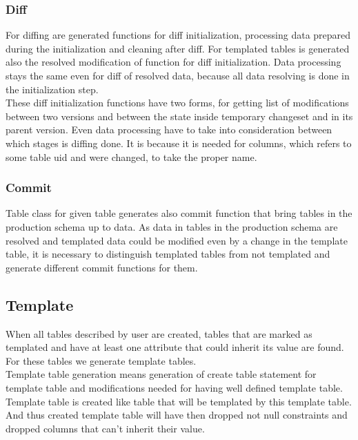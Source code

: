 \documentclass[deska]{subfiles}
\begin{document}
\subsubsection{Diff}
For diffing are generated functions for diff initialization, processing data prepared during the initialization and cleaning after diff. For templated tables is generated also the resolved modification of function for diff initialization. Data processing stays the same even for diff of resolved data, because all data resolving is done in the initialization step.\\
These diff initialization functions have two forms, for getting list of modifications between two versions and between the state inside temporary changeset and in its parent version. Even data processing have to take into consideration between which stages is diffing done. It is because it is needed for columns, which refers to some table uid and were changed, to take the proper name.

\subsubsection{Commit}
Table class for given table generates also commit function that bring tables in the production schema up to data. As data in tables in the production schema are resolved and templated data could be modified even by a change in the template table, it is necessary to distinguish templated tables from not templated and generate different commit functions for them.

\subsection{Template}
When all tables described by user are created, tables that are marked as templated and have at least one attribute that could inherit its value are found. For these tables we generate template tables.\\
Template table generation means generation of create table statement for template table and modifications needed for having well defined template table.
Template table is created like table that will be templated by this template table. And thus created template table will have then dropped not null constraints and dropped columns that can't inherit their value.
\end{document}
